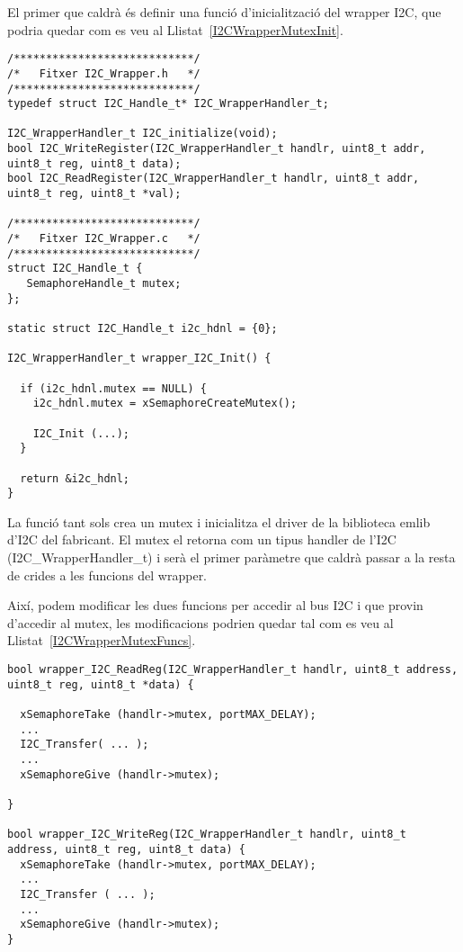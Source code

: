 El primer que caldrà és definir una funció d'inicialització del wrapper I2C, que 
podria quedar com es veu al Llistat~\ref{I2CWrapperMutexInit}.
\begin{lstlisting}[style=customc, label=I2CWrapperMutexInit, caption=Inicialització del {\em wrapper} I2C amb Mutex]
/****************************/
/*   Fitxer I2C_Wrapper.h   */
/****************************/
typedef struct I2C_Handle_t* I2C_WrapperHandler_t;

I2C_WrapperHandler_t I2C_initialize(void);
bool I2C_WriteRegister(I2C_WrapperHandler_t handlr, uint8_t addr, uint8_t reg, uint8_t data);
bool I2C_ReadRegister(I2C_WrapperHandler_t handlr, uint8_t addr, uint8_t reg, uint8_t *val);

/****************************/
/*   Fitxer I2C_Wrapper.c   */
/****************************/
struct I2C_Handle_t {
   SemaphoreHandle_t mutex;
};

static struct I2C_Handle_t i2c_hdnl = {0};

I2C_WrapperHandler_t wrapper_I2C_Init() {

  if (i2c_hdnl.mutex == NULL) {
    i2c_hdnl.mutex = xSemaphoreCreateMutex();
  
    I2C_Init (...);
  }

  return &i2c_hdnl;
} 
\end{lstlisting}

La funció tant sols crea un mutex i inicialitza el driver de la biblioteca  
emlib d'I2C del fabricant. El mutex el retorna com un tipus handler de l'I2C 
(I2C\_WrapperHandler\_t) i serà el primer paràmetre que caldrà passar a la resta 
de crides a les funcions del wrapper.

Així, podem modificar les dues funcions per accedir al bus I2C i que provin 
d'accedir al mutex, les modificacions podrien quedar tal com es veu al 
Llistat~\ref{I2CWrapperMutexFuncs}.

\begin{lstlisting}[style=customc, label=I2CWrapperMutexFuncs, caption=Modificacions a les funcions {\em wrapper} I2C amb Mutex]
bool wrapper_I2C_ReadReg(I2C_WrapperHandler_t handlr, uint8_t address, uint8_t reg, uint8_t *data) {

  xSemaphoreTake (handlr->mutex, portMAX_DELAY);
  ...
  I2C_Transfer( ... );
  ...
  xSemaphoreGive (handlr->mutex);

}

bool wrapper_I2C_WriteReg(I2C_WrapperHandler_t handlr, uint8_t address, uint8_t reg, uint8_t data) {
  xSemaphoreTake (handlr->mutex, portMAX_DELAY);
  ...
  I2C_Transfer ( ... );
  ...
  xSemaphoreGive (handlr->mutex);
} 
\end{lstlisting}

